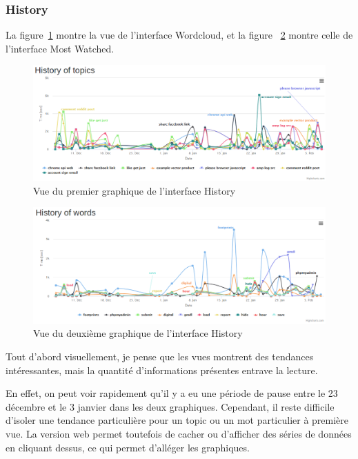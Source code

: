 \FloatBarrier

		\subsubsection{History}

		La figure~\ref{critique-history-topics} montre la vue de l'interface Wordcloud, et la figure ~\ref{critique-history-words} montre celle de l'interface Most Watched.

		\begin{figure}[!h]
			\centering
			\includegraphics[width=1\textwidth]{images/results/critique-history-topics}
			\caption{Vue du premier graphique de l'interface History}
			\label{critique-history-topics}
		\end{figure}

		\begin{figure}[!h]
			\centering
			\includegraphics[width=1\textwidth]{images/results/critique-history-words}
			\caption{Vue du deuxième graphique de l'interface History}
			\label{critique-history-words}
		\end{figure}

		Tout d'abord visuellement, je pense que les vues montrent des tendances intéressantes, mais la quantité d'informations présentes entrave la lecture.

		En effet, on peut voir rapidement qu'il y a eu une période de pause entre le 23 décembre et le 3 janvier dans les deux graphiques. Cependant, il reste difficile d'isoler une tendance particulière pour un topic ou un mot particulier à première vue. La version web permet toutefois de cacher ou d'afficher des séries de données en cliquant dessus, ce qui permet d'alléger les graphiques.

